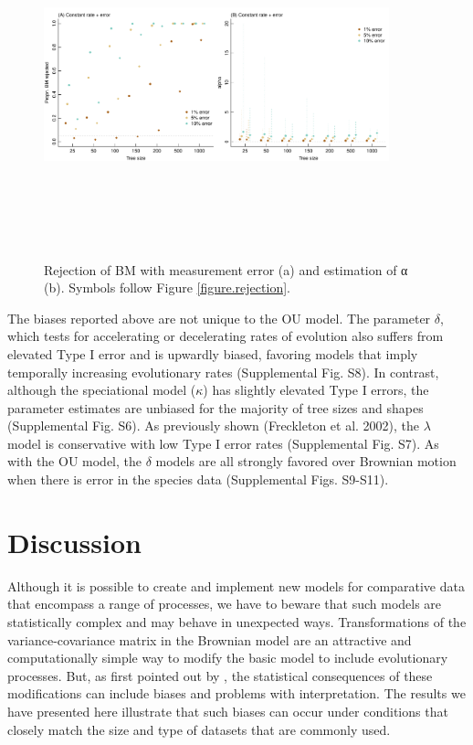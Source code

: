 \documentclass[a4paper,12pt]{article}
\begin{document}
\begin{figure}
  \centering
  \includegraphics[width=10cm, height=10cm, keepaspectratio=true]{Figures/OU_figure5.pdf}
  \caption{Rejection of BM with measurement error (a) and estimation of α (b). Symbols follow Figure \ref{figure.rejection}.}
\label{figure.error}
\end{figure}

The biases reported above are not unique to the OU model. The parameter $\delta$, which tests for accelerating or decelerating rates of evolution \citep{Pagel:1997aa,Pagel:1999aa} also suffers from elevated Type I error and is upwardly biased, favoring models that imply temporally increasing evolutionary rates (Supplemental Fig. S8). In contrast, although the speciational model ($\kappa$) has slightly elevated Type I errors, the parameter estimates are unbiased for the majority of tree sizes and shapes (Supplemental Fig. S6). As previously shown (Freckleton et al. 2002), the $\lambda$ model is conservative with low Type I error rates (Supplemental Fig. S7). As with the OU model, the $\delta$ models are all strongly favored over Brownian motion when there is error in the species data (Supplemental Figs. S9-S11). 

\section{Discussion}
\label{section:discussion}
Although it is possible to create and implement new models for comparative data that encompass a range of processes, we have to beware that such models are statistically complex and may behave in unexpected ways. Transformations of the variance-covariance matrix in the Brownian model are an attractive and computationally simple way to modify the basic model to include evolutionary processes. But, as first pointed out by \citet{grafen1989phylogenetic}, the statistical consequences of these modifications can include biases and problems with interpretation. The results we have presented here illustrate that such biases can occur under conditions that closely match the size and type of datasets that are commonly used. 
\end{document}
